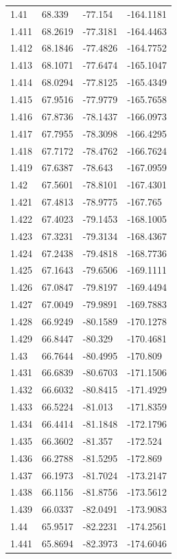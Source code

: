 \begin{tabular}{llll}
1.41 & 68.339 & -77.154 & -164.1181 \\
1.411 & 68.2619 & -77.3181 & -164.4463 \\
1.412 & 68.1846 & -77.4826 & -164.7752 \\
1.413 & 68.1071 & -77.6474 & -165.1047 \\
1.414 & 68.0294 & -77.8125 & -165.4349 \\
1.415 & 67.9516 & -77.9779 & -165.7658 \\
1.416 & 67.8736 & -78.1437 & -166.0973 \\
1.417 & 67.7955 & -78.3098 & -166.4295 \\
1.418 & 67.7172 & -78.4762 & -166.7624 \\
1.419 & 67.6387 & -78.643 & -167.0959 \\
1.42 & 67.5601 & -78.8101 & -167.4301 \\
1.421 & 67.4813 & -78.9775 & -167.765 \\
1.422 & 67.4023 & -79.1453 & -168.1005 \\
1.423 & 67.3231 & -79.3134 & -168.4367 \\
1.424 & 67.2438 & -79.4818 & -168.7736 \\
1.425 & 67.1643 & -79.6506 & -169.1111 \\
1.426 & 67.0847 & -79.8197 & -169.4494 \\
1.427 & 67.0049 & -79.9891 & -169.7883 \\
1.428 & 66.9249 & -80.1589 & -170.1278 \\
1.429 & 66.8447 & -80.329 & -170.4681 \\
1.43 & 66.7644 & -80.4995 & -170.809 \\
1.431 & 66.6839 & -80.6703 & -171.1506 \\
1.432 & 66.6032 & -80.8415 & -171.4929 \\
1.433 & 66.5224 & -81.013 & -171.8359 \\
1.434 & 66.4414 & -81.1848 & -172.1796 \\
1.435 & 66.3602 & -81.357 & -172.524 \\
1.436 & 66.2788 & -81.5295 & -172.869 \\
1.437 & 66.1973 & -81.7024 & -173.2147 \\
1.438 & 66.1156 & -81.8756 & -173.5612 \\
1.439 & 66.0337 & -82.0491 & -173.9083 \\
1.44 & 65.9517 & -82.2231 & -174.2561 \\
1.441 & 65.8694 & -82.3973 & -174.6046 \\

\end{tabular}
